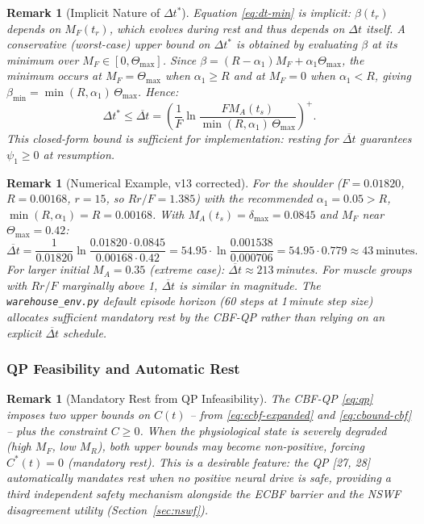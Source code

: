 \documentclass[11pt,a4paper]{article}
\newtheorem{remark}[theorem]{Remark}
\begin{document}
\begin{remark}[Implicit Nature of $\Delta t^*$]
Equation \eqref{eq:dt-min} is implicit: $\beta(t_r)$ depends on
$M_F(t_r)$, which evolves during rest and thus depends on $\Delta t$
itself. A conservative (worst-case) upper bound on $\Delta t^*$ is
obtained by evaluating $\beta$ at its minimum over $M_F \in [0,
\Theta_{\max}]$. Since $\beta = (R - \alpha_1) M_F + \alpha_1
\Theta_{\max}$, the minimum occurs at $M_F = \Theta_{\max}$ when
$\alpha_1 \geq R$ and at $M_F = 0$ when $\alpha_1 < R$, giving
$\beta_{\min} = \min(R, \alpha_1)\,\Theta_{\max}$. Hence:
\begin{equation}\label{eq:dt-bound}
\Delta t^* \leq \overline{\Delta t} = \left(\frac{1}{F} \ln\frac{F M_A(t_s)}{\min(R, \alpha_1)\,\Theta_{\max}}\right)^{+}.
\end{equation}
This closed-form bound is sufficient for implementation: resting for
$\overline{\Delta t}$ guarantees $\psi_1 \geq 0$ at resumption.
\end{remark}

\begin{remark}[Numerical Example, v13 corrected]
For the shoulder ($F = 0.01820$, $R = 0.00168$, $r = 15$, so $Rr/F =
1.385$) with the recommended $\alpha_1 = 0.05 > R$, $\min(R, \alpha_1)
= R = 0.00168$. With $M_A(t_s) = \delta_{\max} = 0.0845$ and $M_F$
near $\Theta_{\max} = 0.42$:
\[
\overline{\Delta t} = \frac{1}{0.01820} \ln\frac{0.01820 \cdot 0.0845}{0.00168 \cdot 0.42}
= 54.95 \cdot \ln\frac{0.001538}{0.000706}
= 54.95 \cdot 0.779
\approx 43\ \text{minutes}.
\]
For larger initial $M_A = 0.35$ (extreme case): $\overline{\Delta t}
\approx 213$\,minutes. For muscle groups with $Rr/F$ marginally above
1, $\overline{\Delta t}$ is similar in magnitude. The
\texttt{warehouse\_env.py} default episode horizon (60 steps at
1\,minute step size) allocates sufficient mandatory rest by the
CBF-QP rather than relying on an explicit $\overline{\Delta t}$
schedule.
\end{remark}

\subsubsection{QP Feasibility and Automatic Rest}

\begin{remark}[Mandatory Rest from QP Infeasibility]
The CBF-QP \eqref{eq:qp} imposes two upper bounds on $C(t)$ -- from
\eqref{eq:ecbf-expanded} and \eqref{eq:cbound-cbf} -- plus the
constraint $C \geq 0$. When the physiological state is severely
degraded (high $M_F$, low $M_R$), both upper bounds may become
non-positive, forcing $C^*(t) = 0$ (mandatory rest). This is a
desirable feature: the QP [27, 28] automatically mandates rest when
no positive neural drive is safe, providing a third independent
safety mechanism alongside the ECBF barrier and the NSWF disagreement
utility (Section~\ref{sec:nswf}).
\end{remark}
\end{document}
